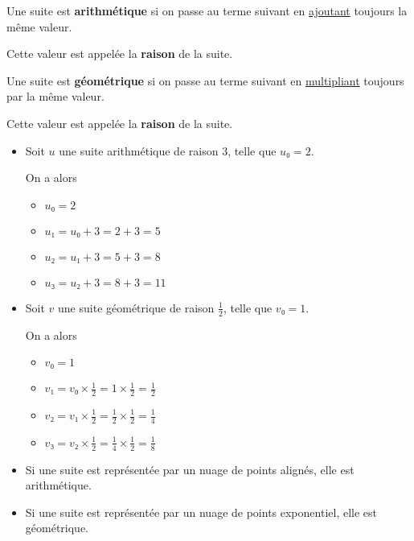 \documentclass[
	classe=$1^{ere}STI2D$
]{coursclass}
\begin{document}
\begin{definition}
	Une suite est \textbf{arithmétique} si on passe au terme suivant en \uline{ajoutant} toujours la même valeur.

	Cette valeur est appelée la \textbf{raison} de la suite.
\end{definition}

\begin{definition}
	Une suite est \textbf{géométrique} si on passe au terme suivant en \uline{multipliant} toujours par la même valeur.

	Cette valeur est appelée la \textbf{raison} de la suite.
\end{definition}

\begin{exemple}
	\begin{itemize}
		\item Soit $u$ une suite arithmétique de raison $3$, telle que $u₀ = 2$.

		      On a alors
		      \begin{itemize}
			      \item $u₀ = 2$
			      \item $u₁ = u₀ + 3 = 2 + 3 = 5$
			      \item $u₂ = u₁ + 3 = 5 + 3 = 8$
			      \item $u₃ = u₂ + 3 = 8 + 3 = 11$
		      \end{itemize}
		\item Soit $v$ une suite géométrique de raison $\frac{1}{2}$, telle que $v₀	= 1$.

		      On a alors
		      \begin{itemize}
			      \setlength{\itemsep}{0.6em}
			      \item $v₀ = 1$
			      \item $v₁ = v₀ × \frac{1}{2} = 1 × \frac{1}{2} = \frac{1}{2}$
			      \item $v₂ = v₁ × \frac{1}{2} = \frac{1}{2} × \frac{1}{2} = \frac{1}{4}$
			      \item $v₃ = v₂ × \frac{1}{2} = \frac{1}{4} × \frac{1}{2} = \frac{1}{8}$
		      \end{itemize}
	\end{itemize}
\end{exemple}

\begin{propriete}
	\begin{itemize}
		\item Si une suite est représentée par un nuage de points alignés, elle est arithmétique.
		\item Si une suite est représentée par un nuage de points exponentiel, elle est géométrique.
	\end{itemize}
\end{propriete}
\end{document}
